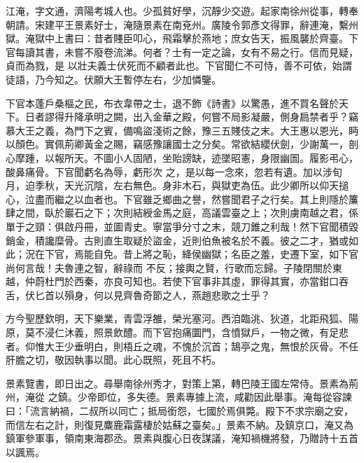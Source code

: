 
\begin{pinyinscope}

 江淹，字文通，濟陽考城人也。少孤貧好學，沉靜少交遊。起家南徐州從事，轉奉朝請。宋建平王景素好士，淹隨景素在南兗州。廣陵令郭彥文得罪，辭連淹，繫州獄。淹獄中上書曰：昔者賤臣叩心，飛霜擊於燕地；庶女告天，振風襲於齊臺。下官每讀其書，未嘗不廢卷流涕。何者？士有一定之論，女有不易之行。信而見疑，貞而為戮，是
 以壯夫義士伏死而不顧者此也。下官聞仁不可恃，善不可依，始謂徒語，乃今知之。伏願大王暫停左右，少加憐鑒。



 下官本蓬戶桑樞之民，布衣韋帶之士，退不飾《詩書》以驚愚，進不買名聲於天下。日者謬得升降承明之闕，出入金華之殿，何嘗不局影凝嚴，側身扃禁者乎？竊慕大王之義，為門下之賓，備鳴盜淺術之餘，豫三五賤伎之末。大王惠以恩光，眄以顏色。實佩荊卿黃金之賜，竊感豫讓國士之分矣。常欲結纓伏劍，少謝萬一，剖心摩踵，以報所天。不圖小人固陋，坐貽謗缺，迹墜昭憲，身限幽圄。履影弔心，酸鼻痛骨。下官聞虧名為辱，虧形次
 之，是以每一念來，忽若有遺。加以涉旬月，迫季秋，天光沉陰，左右無色。身非木石，與獄吏為伍。此少卿所以仰天搥心，泣盡而繼之以血者也。下官雖乏鄉曲之譽，然嘗聞君子之行矣。其上則隱於簾肆之間，臥於巖石之下；次則結綬金馬之庭，高議雲臺之上；次則虜南越之君，係單于之頸：俱啟丹冊，並圖青史。寧當爭分寸之末，競刀錐之利哉！然下官聞積毀銷金，積讒糜骨。古則直生取疑於盜金，近則伯魚被名於不義。彼之二才，猶或如此；況在下官，焉能自免。昔上將之恥，絳侯幽獄；名臣之羞，史遷下室，如下官尚何言哉！夫魯連之智，辭祿而
 不反；接輿之賢，行歌而忘歸。子陵閉關於東越，仲蔚杜門於西秦，亦良可知也。若使下官事非其虛，罪得其實，亦當鉗口吞舌，伏匕首以殞身，何以見齊魯奇節之人，燕趙悲歌之士乎？



 方今聖歷欽明，天下樂業，青雲浮雒，榮光塞河。西洎臨洮、狄道，北距飛狐、陽原，莫不浸仁沐義，照景飲醴。而下官抱痛圜門，含憤獄戶，一物之微，有足悲者。仰惟大王少垂明白，則梧丘之魂，不愧於沉首；鵠亭之鬼，無恨於灰骨。不任肝膽之切，敬因執事以聞。此心既照，死且不朽。



 景素覽書，即日出之。尋舉南徐州秀才，對策上第，轉巴陵王國左常侍。景素為荊州，淹從
 之鎮。少帝即位，多失德。景素專據上流，咸勸因此舉事。淹每從容諫曰：「流言納禍，二叔所以同亡；抵局銜怨，七國於焉俱斃。殿下不求宗廟之安，而信左右之計，則復見麋鹿霜露棲於姑蘇之臺矣。」景素不納。及鎮京口，淹又為鎮軍參軍事，領南東海郡丞。景素與腹心日夜謀議，淹知禍機將發，乃贈詩十五首以諷焉。




\end{pinyinscope}

